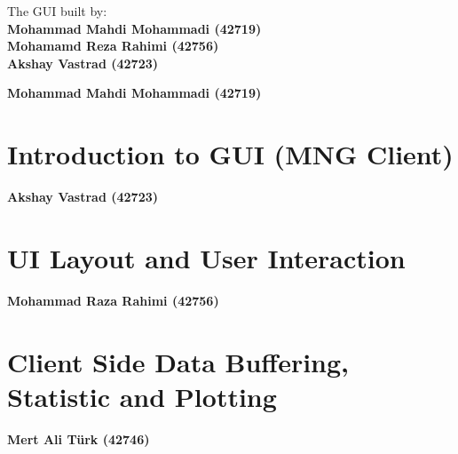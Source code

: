 \documentclass[11pt, a4paper]{report}
\begin{document}
\newpage
\null 
\vfill
\begin{center}
The GUI built by:\\ 
\textbf{\large Mohammad Mahdi Mohammadi (42719)\\
Mohamamd Reza Rahimi (42756)\\ 
Akshay Vastrad (42723)}
\end{center}
\vfill
\thispagestyle{empty}
\clearpage


\clearpage 
\null 
\vfill 
\begin{center}
{\large \textbf{Mohammad Mahdi Mohammadi (42719)}}
\end{center}
\vfill 
{}
\newpage 
\chapter{Introduction to GUI (MNG Client)}



\clearpage 
\null 
\vfill 
\begin{center}
{\large \textbf{Akshay Vastrad (42723)}}
\end{center}
\vfill 
{}
\newpage


\chapter{UI Layout and User Interaction}


\clearpage
\null
\vfill 
\begin{center}
{\large  \textbf{Mohammad Raza Rahimi (42756)}} \\     
\end{center}
\vfill 
{}
\clearpage 

\chapter{Client Side Data Buffering, Statistic and Plotting}






\newpage
\null 
\vfill
\begin{center}
\textbf{\large Mert Ali Türk (42746)}
\end{center}
\vfill
{}
\clearpage
\end{document}
